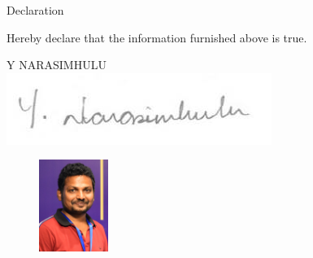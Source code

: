 \documentclass{resume} %
\begin{document}
\begin{rSection}{Declaration}
	
	\begin{rSubsection}{}{}{}{}	
		\item[] Hereby declare that the information furnished above is true.
	\end{rSubsection}

	\vspace{1cm}

	\begin{flushright}
		Y NARASIMHULU \\
		\includegraphics[scale=0.75]{signature.jpg}
	\end{flushright}


\begin{figure}[!hbt]
		\begin{flushright}
			\includegraphics[width=0.2\textwidth]{Narasimpassport.png}
		\end{flushright}
\end{figure}

	
\end{rSection}




\end{document}
